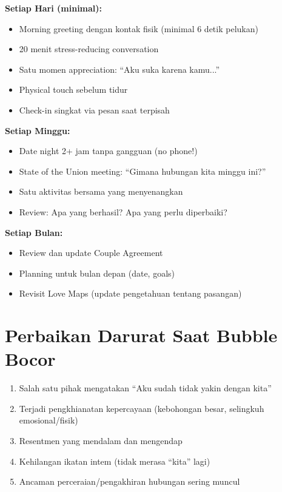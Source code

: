 \begin{praktikbox}
\textbf{Setiap Hari (minimal):}
\begin{itemize}
    \item[$\square$] Morning greeting dengan kontak fisik (minimal 6 detik pelukan)
    \item[$\square$] 20 menit stress-reducing conversation
    \item[$\square$] Satu momen appreciation: ``Aku suka karena kamu...''
    \item[$\square$] Physical touch sebelum tidur
    \item[$\square$] Check-in singkat via pesan saat terpisah
\end{itemize}

\textbf{Setiap Minggu:}
\begin{itemize}
    \item[$\square$] Date night 2+ jam tanpa gangguan (no phone!)
    \item[$\square$] State of the Union meeting: ``Gimana hubungan kita minggu ini?''
    \item[$\square$] Satu aktivitas bersama yang menyenangkan
    \item[$\square$] Review: Apa yang berhasil? Apa yang perlu diperbaiki?
\end{itemize}

\textbf{Setiap Bulan:}
\begin{itemize}
    \item[$\square$] Review dan update Couple Agreement
    \item[$\square$] Planning untuk bulan depan (date, goals)
    \item[$\square$] Revisit Love Maps (update pengetahuan tentang pasangan)
\end{itemize}
\end{praktikbox}

\section{Perbaikan Darurat Saat Bubble Bocor}

\begin{warningbox}
\begin{enumerate}
    \item Salah satu pihak mengatakan ``Aku sudah tidak yakin dengan kita''
    \item Terjadi pengkhianatan kepercayaan (kebohongan besar, selingkuh emosional/fisik)
    \item Resentmen yang mendalam dan mengendap
    \item Kehilangan ikatan intem (tidak merasa ``kita'' lagi)
    \item Ancaman perceraian/pengakhiran hubungan sering muncul
\end{enumerate}
\end{warningbox}

